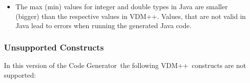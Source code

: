\documentclass[\pformat,11pt]{article}
\newcommand{\tcg}{the Code Generator}
\newcommand{\VDM}{VDM++}
\begin{document}
\begin{itemize}
  Let us now look at class {\tt D}: The statement {\tt b.SetVal(1)} calls
  the {\tt SetVal} operation in class {\tt B} and will be code generated as
  {\tt b.SetVal(1)} in Java. In Java it is not possible to invoke
  overriden methods from outside the class that does the overriding.
  There is therefore no way to call the {\tt SetVal} method in class {\tt A}.
  The quoted operation calls in class {\tt D} are therefore all code
  generated as {\tt b.SetVal(1)}. The code generating will however
  give the warning ``{\em Quoted method call is removed}'' in order to
  inform the user.

\item The max (min) values for integer and double types in Java are
  smaller (bigger) than the respective values in \VDM{}. Values, that
  are not valid in Java lead to errors when running the generated Java
  code. 
\end{itemize}

\subsubsection{Unsupported Constructs}
\label{lim2}

In this version of \tcg\ the following \VDM\ constructs are
not supported:
\end{document}
